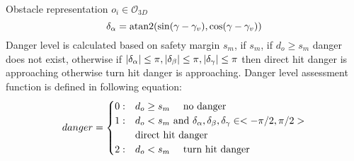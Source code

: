 \begin{definition}{Obstacle representation $o_i\in\mathscr{O}_{3D}$}
\begin{equation}
    \end{equation}
    \begin{equation}
        \delta_\alpha = \textnormal{atan2}(\sin(\gamma-\gamma_v),\cos(\gamma-\gamma_v))
    \end{equation}
Danger level is calculated based on safety margin $s_m$, if $s_m$, if $d_o \ge s_m$ danger does not exist, otherwise if $\left|{\delta_\alpha}\right| \le \pi, \left|{\delta_\beta}\right| \le \pi, \left|{\delta_\gamma}\right| \le \pi $ then direct hit danger is approaching otherwise turn hit danger is approaching. Danger level assessment function is defined in following equation:
    \begin{equation}
        danger = 
        \begin{cases}
            0:&d_o \ge s_m\quad\textnormal{ no danger}\\
            1:&d_o < s_m \textnormal{ and } \delta_\alpha,\delta_\beta,\delta_\gamma\in <-\pi/2,\pi/2> \\&\textnormal{direct hit danger}\\
            2:&d_o < s_m \quad\textnormal{ turn hit danger}\\
        \end{cases}
    \end{equation}

\end{definition}

